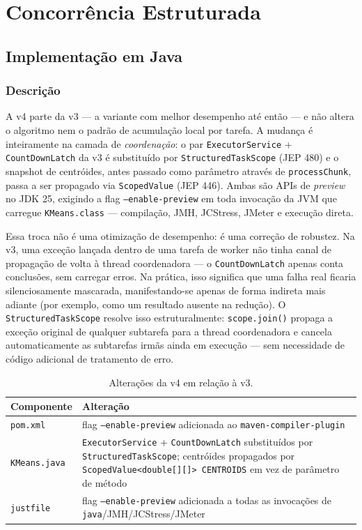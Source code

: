 \section{Concorrência Estruturada}
\label{sec:structured}

\subsection{Implementação em Java}

\subsubsection{Descrição}

A v4 parte da v3 --- a variante com melhor desempenho até então --- e não
altera o algoritmo nem o padrão de acumulação local por tarefa. A mudança
é inteiramente na camada de \emph{coordenação}: o par
\texttt{ExecutorService} + \texttt{CountDownLatch} da v3 é substituído por
\texttt{StructuredTaskScope} (JEP 480) e o snapshot de centróides, antes
passado como parâmetro através de \texttt{processChunk}, passa a ser
propagado via \texttt{ScopedValue} (JEP 446). Ambas são APIs de
\textit{preview} no JDK 25, exigindo a flag \texttt{--enable-preview} em
toda invocação da JVM que carregue \texttt{KMeans.class} --- compilação,
JMH, JCStress, JMeter e execução direta.

Essa troca não é uma otimização de desempenho: é uma correção de
robustez. Na v3, uma exceção lançada dentro de uma tarefa de worker não
tinha canal de propagação de volta à thread coordenadora --- o
\texttt{CountDownLatch} apenas conta conclusões, sem carregar erros. Na
prática, isso significa que uma falha real ficaria silenciosamente
mascarada, manifestando-se apenas de forma indireta mais adiante (por
exemplo, como um resultado ausente na redução). O
\texttt{StructuredTaskScope} resolve isso estruturalmente:
\texttt{scope.join()} propaga a exceção original de qualquer subtarefa
para a thread coordenadora e cancela automaticamente as subtarefas
irmãs ainda em execução --- sem necessidade de código adicional de
tratamento de erro.

\begin{table}[H]
\centering
\begin{tabular}{lp{11cm}}
\hline
\textbf{Componente} & \textbf{Alteração} \\
\hline
\texttt{pom.xml}    & flag \texttt{--enable-preview} adicionada ao \texttt{maven-compiler-plugin} \\
\texttt{KMeans.java} & \texttt{ExecutorService} + \texttt{CountDownLatch} substituídos por
                       \texttt{StructuredTaskScope}; centróides propagados por
                       \texttt{ScopedValue<double[][]> CENTROIDS} em vez de parâmetro de método \\
\texttt{justfile}   & flag \texttt{--enable-preview} adicionada a todas as invocações de
                       \texttt{java}/JMH/JCStress/JMeter \\
\hline
\end{tabular}
\caption{Alterações da v4 em relação à v3.}
\label{tab:v4-changes}
\end{table}

